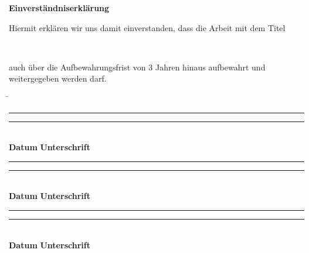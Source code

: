 \thispagestyle{empty}
\begin{center}
    \textbf{\Large Einverständniserklärung}
\end{center}

\vspace{2cm}

Hiermit erklären wir uns damit einverstanden, dass die Arbeit mit dem Titel 

\vspace*{2cm}
	\Large\bf\myTopic\\
	\vspace*{2cm}
	\normalsize\rm

auch über die Aufbewahrungsfrist von 3 Jahren hinaus aufbewahrt und weitergegeben werden darf.

\vspace{3cm}

\begin{tabbing}
    \hspace{7cm} \= \hspace{5cm} \kill
    \rule{6cm}{0.4pt} \hspace{1cm} \rule{6cm}{0.4pt} \\
    \textbf{Datum} \hspace{6.2cm} \textbf{Unterschrift} \\[1.5cm]
    \rule{6cm}{0.4pt} \hspace{1cm} \rule{6cm}{0.4pt} \\
    \textbf{Datum} \hspace{6.2cm} \textbf{Unterschrift} \\[1.5cm]
    \rule{6cm}{0.4pt} \hspace{1cm} \rule{6cm}{0.4pt} \\
    \textbf{Datum} \hspace{6.2cm} \textbf{Unterschrift}
\end{tabbing}

\newpage
